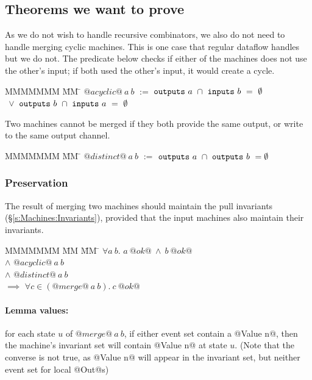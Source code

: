 \subsection{Theorems we want to prove}

As we do not wish to handle recursive combinators, we also do not need to handle merging cyclic machines.
This is one case that regular dataflow handles but we do not.
The predicate below checks if either of the machines does not use the other's input; if both used the other's input, it would create a cycle.

\begin{tabbing}
MMMMMMM \= MM \= \kill
$@acyclic@~a~b$
\> $:=$
\> $\mathtt{outputs}~a~\cap~\mathtt{inputs}~b~=~\emptyset$
\\
\> $~\vee$ \> $\mathtt{outputs}~b~\cap~\mathtt{inputs}~a~=~\emptyset$
\end{tabbing}

Two machines cannot be merged if they both provide the same output, or write to the same output channel.

\begin{tabbing}
MMMMMMM \= MM \= \kill
$@distinct@~a~b$
\> $:=$
\> $\mathtt{outputs}~a~\cap~\mathtt{outputs}~b~=\emptyset$
\end{tabbing}

\subsubsection{Preservation}
The result of merging two machines should maintain the pull invariants (\S\ref{s:Machines:Invariants}), provided that the input machines also maintain their invariants.

\begin{tabbing}
MMMMMMM \= MM \= MM \= \kill
$\forall a~b.$
\>
\> $a~@ok@~\wedge~b~@ok@$
\\
\> $\wedge$
\> $@acyclic@~a~b$
\\
\> $\wedge$
\> $@distinct@~a~b$
\\
\> $\implies$
\> $\forall c \in (@merge@~a~b).\ c~@ok@$
\end{tabbing}

\paragraph{Lemma values:} 
for each state $u$ of $@merge@~a~b$, if either event set contain a @Value n@, then the machine's invariant set will contain @Value n@ at state $u$.
(Note that the converse is not true, as @Value n@ will appear in the invariant set, but neither event set for local @Out@s)

